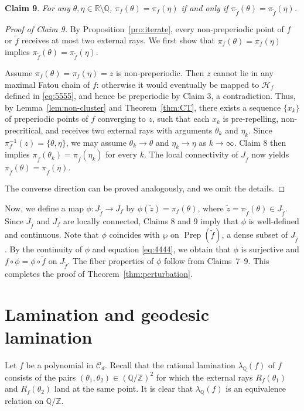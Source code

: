 \documentclass[a4paper,reqno,times, 11pt]{amsart}
\theoremstyle{remark}
\theoremstyle{plain}
\numberwithin{equation}{section}
\def\HHH{{\cal H}}
\def\CCCC{\mathscr C}
\def\t{\tilde}
\def\R{\mbox{$\mathbb R$}}
\def\Q{\mathbb Q}
\def\Z{\mbox{$\mathbb Z$}}
\def\cal{\mathcal}
\begin{document}
{\bf Claim 9}. \emph{For any $\theta,\eta\in\R\setminus \Q$, $\pi_{f}(\theta)=\pi_f(\eta)$ if and only if $\pi_{\t{f}}(\theta)=\pi_{\t{f}}(\eta)$.}
\begin{proof}[Proof of Claim 9]
By Proposition~\ref{pro:iterate}, every non‑preperiodic point of \(f\) or \(\tilde f\) receives at most two external rays.
We first show that \(\pi_{f}(\theta)=\pi_{ f}(\eta)\) implies \(\pi_{\t{f}}(\theta)=\pi_{\t{f}}(\eta)\).

Assume \(\pi_{f}(\theta)=\pi_{f}(\eta)= z\) is non‑preperiodic. Then \(z\) cannot lie in any maximal Fatou chain of $f$: otherwise it would eventually be mapped  to \(\HHH_{f}\) defined in \eqref{eq:5555}, and hence be preperiodic by Claim 3, a contradiction. Thus, by Lemma~\ref{lem:non-cluster} and Theorem~\ref{thm:CT}, there exists a sequence \(\{x_k\}\) of preperiodic points of \(f\) converging to \(z\), such that each \(x_k\) is pre-repelling, non-precritical, and receives two external rays with arguments \(\theta_k\) and \(\eta_k\). Since \(\pi_{f}^{-1}(z)=\{\theta,\eta\}\), we may assume \(\theta_k\to\theta\) and \(\eta_k\to\eta\) as \(k\to\infty\).  Claim 8 then implies \(\pi_{\t{f}}(\theta_k)=\pi_{\t{f}}(\eta_k)\) for every \(k\). The local connectivity of \(J_{\t{f}}\) now yields \(\pi_{\t{f}}(\theta)=\pi_{\t{f}}(\eta)\).

The converse direction can be proved analogously, and we omit the details.
\end{proof}

Now, we define a map $\phi: J_{\t{f}} \to J_f$ by $\phi(\t{z}) = \pi_f(\theta)$, where $\t{z} = \pi_{\t{f}}(\theta) \in J_{\t{f}}$. 
Since $J_{\t{f}}$ and $J_f$ are locally connected, Claims 8 and 9 imply that $\phi$ is well-defined and continuous. 
Note that $\phi$ coincides with $\wp$ on $\operatorname{Prep}(\t{f})$, a dense subset of $J_{\t{f}}$. 
By the continuity of $\phi$ and equation \eqref{eq:4444}, we obtain that $\phi$ is surjective and $f \circ \phi = \phi \circ \t{f}$ on $J_{\t{f}}$. 
The fiber properties of $\phi$ follow from Claims~7--9. 
This completes the proof of Theorem~\ref{thm:perturbation}.

	
	\section{Lamination and geodesic lamination}
	
	Let $f$ be a polynomial in $\CCCC_d$. Recall that
	the rational lamination $\lambda_\mathbb{Q}(f)$ of $f$ consists of the pairs $(\theta_1,\theta_2)\in(\Q/\mathbb{Z})^2$ for which the external rays $R_f(\theta_1)$ and $R_f(\theta_2)$ land at the same point.  It is clear that $\lambda_\Q(f)$ is an equivalence relation on $\Q/\Z$.
	
\end{document}

